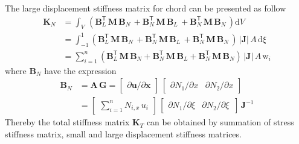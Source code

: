 The large displacement stiffness matrix for chord can be presented as follow
\begin{equation}
\begin{aligned}
\mathbf{K}_{N} & =  \int_{V} \,  \left(\mathbf{B}_L^{\mathsf{T}} \, \mathbf{M} \, \mathbf{B}_N \, + \mathbf{B}_N^{\mathsf{T}} \, \mathbf{M} \, \mathbf{B}_L \, + \mathbf{B}_N^{\mathsf{T}} \, \mathbf{M} \, \mathbf{B}_N \,  \right) \mathrm{d} V \\
& = \int_{-1}^{1} \left(\mathbf{B}_L^{\mathsf{T}} \, \mathbf{M} \, \mathbf{B}_N \, + \mathbf{B}_N^{\mathsf{T}} \, \mathbf{M} \, \mathbf{B}_L \, + \mathbf{B}_N^{\mathsf{T}} \, \mathbf{M} \, \mathbf{B}_N \,  \right) \, |\mathbf{J}|  \, A \,  \mathrm{d} \xi \\
& = \sum_{i=1}^{n}  \left(\mathbf{B}_L^{\mathsf{T}} \, \mathbf{M} \, \mathbf{B}_N + \mathbf{B}_N^{\mathsf{T}} \, \mathbf{M} \, \mathbf{B}_L + \mathbf{B}_N^{\mathsf{T}} \, \mathbf{M} \, \mathbf{B}_N \right) \, |\mathbf{J}| \, A \, \mathrm{w}_i
\end{aligned}
\end{equation}
where $\mathbf{B}_N$ have the expression 
\begin{equation}
\begin{aligned}
\mathbf{B}_{N} & =  \mathbf{A} \, \mathbf{G} = \begin{bmatrix}
\partial \mathbf{u} / \partial \mathbf{x} 
\end{bmatrix} \, \begin{bmatrix}
\partial N_1 / \partial x & \partial N_2 / \partial x
\end{bmatrix} \\
& = \begin{bmatrix}
\sum\nolimits_{i=1}^n N_{i,x} \, u_i
\end{bmatrix} \, \begin{bmatrix}
\partial N_1 / \partial \xi &  \partial N_2 / \partial \xi \, 
\end{bmatrix} \, \mathbf{J}^{-1}
\end{aligned}
\end{equation}
Thereby the total stiffness matrix $\mathbf{K}_T$ can be obtained by summation of stress stiffness matrix, small and large displacement stiffness matrices.


